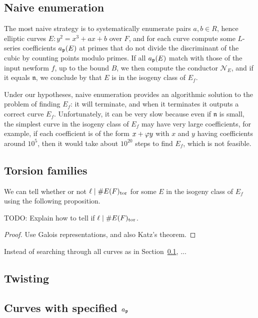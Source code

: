 \documentclass{amsart}
\newcommand{\n}{\mathfrak{n}}
\newcommand{\cN}{\mathcal{N}}
\begin{document}
\subsection{Naive enumeration}\label{sec:naive}

The most naive strategy is to systematically enumerate pairs $a,b\in
R$, hence elliptic curves $E: y^2 = x^3 + ax + b$ over $F$, and for
each curve compute some $L$-series coefficients $a_{\mathfrak{p}}(E)$ at primes
that do not divide the discriminant of the cubic by counting points
modulo primes.  If all $a_{\mathfrak{p}}(E)$ match with those of the input newform
$f$, up to the bound $B$, we then compute the conductor $\cN_E$, and
if it equals $\n$, we conclude by \cite{faltings:xx} that $E$ is in the isogeny class
of $E_f$.

Under our hypotheses, naive enumeration provides an algorithmic
solution to the problem of finding $E_f$: it will terminate, and when
it terminates it outputs a correct curve $E_f$. Unfortunately, it can
be very slow because even if $\n$ is small, the simplest curve in the
isogeny class of $E_f$ may have very large coefficients, for example,
if each coefficient is of the form $x+\varphi y$ with $x$ and $y$ having
coefficients around $10^5$, then it would take about $10^{20}$ steps
to find $E_f$, which is not feasible.

\subsection{Torsion families}\label{sec:torsion}

We can tell whether or not $\ell\mid \#E(F)_{\operatorname{tor}}$ for some
$E$ in the isogeny class of $E_f$ using the following proposition.

\begin{proposition}
 TODO: Explain how to tell if $\ell\mid \#E(F)_{\operatorname{tor}}$.
\end{proposition}
\begin{proof}
  Use Galois representations, and also Katz's theorem.
\end{proof}

Instead of searching through all curves as in Section~\ref{sec:naive},
...


\subsection{Twisting}

\subsection{Curves with specified $a_{\mathfrak{p}}$}
\end{document}
